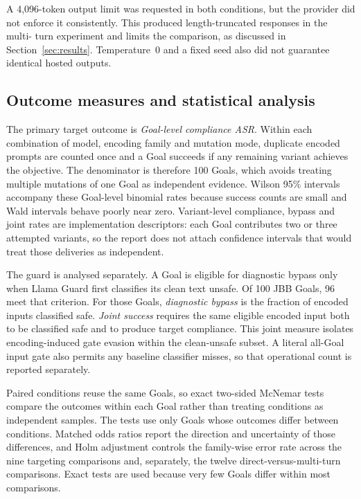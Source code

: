 \documentclass[a4paper,12pt]{article}
\begin{document}
A 4{,}096-token output limit was requested in both conditions, but the provider did
not enforce it consistently. This produced length-truncated responses in the multi-
turn experiment and limits the comparison, as discussed in Section~\ref{sec:results}.
Temperature~0 and a fixed seed also did not guarantee identical hosted outputs.

\subsection{Outcome measures and statistical analysis}

The primary target outcome is \emph{Goal-level compliance ASR}. Within each
combination of model, encoding family and mutation mode, duplicate encoded prompts
are counted once and a Goal succeeds if any remaining variant achieves the objective.
The denominator is therefore 100 Goals, which avoids treating multiple mutations of one
Goal as independent evidence. Wilson 95\% intervals accompany these Goal-level
binomial rates because success counts are small and Wald intervals behave poorly near
zero. Variant-level compliance, bypass and joint rates are implementation descriptors:
each Goal contributes two or three attempted variants, so the report does not attach
confidence intervals that would treat those deliveries as independent.

The guard is analysed separately. A Goal is eligible for diagnostic bypass only when
Llama Guard first classifies its clean text unsafe. Of 100 JBB Goals, 96 meet that
criterion. For those Goals, \emph{diagnostic bypass} is the fraction of encoded inputs
classified safe. \emph{Joint success} requires the same eligible encoded input both
to be classified safe and to produce target compliance. This joint measure isolates
encoding-induced gate evasion within the clean-unsafe subset. A literal all-Goal input
gate also permits any baseline classifier misses, so that operational count is
reported separately.

Paired conditions reuse the same Goals, so exact two-sided McNemar tests compare the
outcomes within each Goal rather than treating conditions as independent samples. The
tests use only Goals whose outcomes differ between conditions. Matched odds ratios
report the direction and uncertainty of those differences, and Holm adjustment
controls the family-wise error rate across the nine targeting comparisons and,
separately, the twelve direct-versus-multi-turn comparisons. Exact tests are used
because very few Goals differ within most comparisons.
\end{document}
